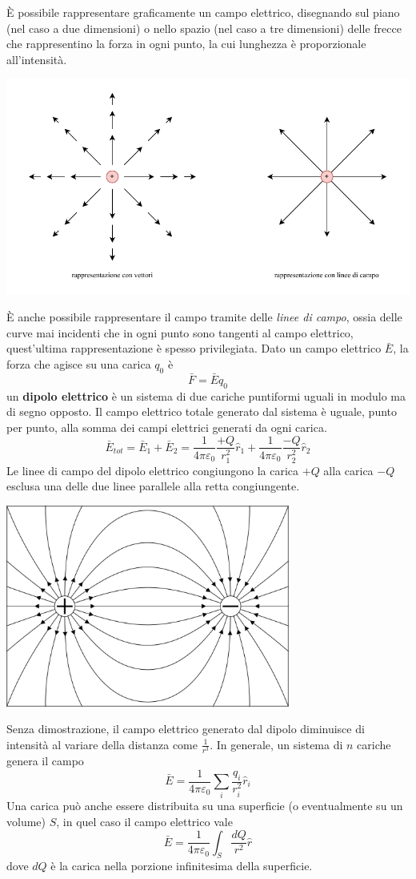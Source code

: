 \documentclass[10pt, letterpaper]{report}
\begin{document}
È possibile rappresentare graficamente un campo elettrico, disegnando sul piano (nel caso a due dimensioni) o nello spazio (nel caso a tre dimensioni) delle frecce che rappresentino la forza in ogni punto, la cui lunghezza è proporzionale all'intensità.\begin{center}
    \includegraphics[width=1\textwidth ]{images/campoElettrico.pdf}
\end{center}
È anche possibile rappresentare il campo tramite delle \textit{linee di campo}, ossia delle curve mai incidenti che in ogni punto sono tangenti al campo elettrico, quest'ultima rappresentazione è spesso privilegiata. \acc 
Dato un campo elettrico $\bar E$, la forza che agisce su una carica $q_0$ è $$\bar F =\bar E q_0$$
 un \textbf{dipolo elettrico} è un sistema di due cariche puntiformi uguali in modulo ma di segno opposto.\acc 
Il campo elettrico totale generato dal sistema è uguale, punto per punto, alla somma dei campi elettrici generati da ogni carica.
$$ \bar E_{tot}=\bar E_1 + \bar E_2 = \frac{1}{4\pi\varepsilon_0}\frac{+Q}{r_1^2}\hat r_1+\frac{1}{4\pi\varepsilon_0}\frac{-Q}{r_2^2}\hat r_2$$
Le linee di campo del dipolo elettrico congiungono la carica $+Q$ alla carica $-Q$ esclusa una delle due linee parallele alla retta congiungente.\begin{center}
    \includegraphics[width=0.7\textwidth ]{images/dipolo.eps}
\end{center}
Senza dimostrazione, il campo elettrico generato dal dipolo diminuisce di intensità al variare della distanza come $\frac{1}{r^3}$. In generale, un sistema di $n$ cariche genera il campo 
$$ \bar E = \frac{1}{4\pi\varepsilon_0}\sum_i\frac{q_i}{r^2_i}\hat r_i$$
Una carica può anche essere distribuita su una superficie (o eventualmente su un volume) $S$, in quel caso il campo elettrico vale 
$$\bar E=  \frac{1}{4\pi\varepsilon_0}\int_S \frac{d Q}{r^2}\hat r$$
dove $dQ$ è la carica nella porzione infinitesima della superficie.
\end{document}

